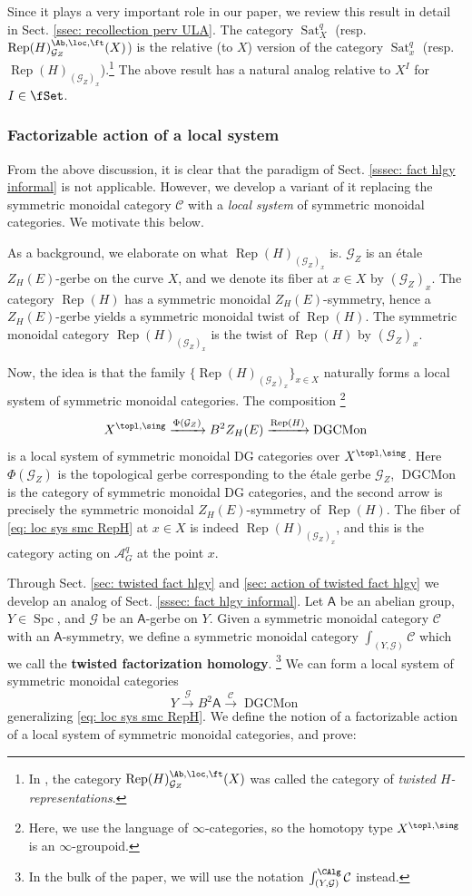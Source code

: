 \documentclass[10pt]{amsart}
\newcommand{\sssec}{\subsubsection}
\theoremstyle{remark}
\newcommand{\on}{\operatorname}
\newcommand{\cA}{\mathcal{A}}
\newcommand{\cC}{\mathcal{C}}
\newcommand{\cG}{\mathcal{G}}
\newcommand{\DGCatSymMon}{\on{DGCMon}}
\newcommand{\Rep}{\on{Rep}}
\newcommand{\Sat}{\on{Sat}}
\newcommand{\Spc}{\on{Spc}}
\newcommand{\sfA}{\mathsf{A}}
\begin{document}
Since it plays a very important role in our paper, we review this result in detail in Sect. \ref{ssec: recollection perv ULA}. The category $\Sat^q_X$ (resp. $\Rep(H)^{\Ab,\loc,\ft}_{\cG_Z}(X)$) is the relative (to $X$) version of the category $\Sat^q_x$ (resp. $\Rep(H)_{(\cG_Z)_x}$).\footnote{In \cite{ZhaoNew}, the category $\Rep(H)^{\Ab,\loc,\ft}_{\cG_Z}(X)$ was called the category of \emph{twisted $H$-representations}.} The above result has a natural analog relative to $X^I$ for $I\in\fSet$.

\sssec{Factorizable action of a local system}
From the above discussion, it is clear that the paradigm of Sect. \ref{sssec: fact hlgy informal} is not applicable. However, we develop a variant of it replacing the symmetric monoidal category $\cC$ with a \emph{local system} of symmetric monoidal categories. We motivate this below.
\medskip

As a background, we elaborate on what $\Rep(H)_{(\cG_Z)_x}$ is. $\cG_Z$ is an \'etale $Z_H(E)$-gerbe on the curve $X$, and we denote its fiber at $x\in X$ by $(\cG_Z)_x$. The category $\Rep(H)$ has a symmetric monoidal $Z_H(E)$-symmetry, hence a $Z_H(E)$-gerbe yields a symmetric monoidal twist of $\Rep(H)$. The symmetric monoidal category $\Rep(H)_{(\cG_Z)_x}$ is the twist of $\Rep(H)$ by $(\cG_Z)_x$. 
\medskip

Now, the idea is that the family $\{\Rep(H)_{(\cG_Z)_x}\}_{x\in X}$ naturally forms a local system of symmetric monoidal categories. The composition \footnote{Here, we use the language of $\infty$-categories, so the homotopy type $X^{\topl,\sing}$ is an $\infty$-groupoid.}
\begin{equation}\label{eq: loc sys smc RepH}
    X^{\topl,\sing}\xrightarrow{\Phi(\cG_Z)}B^2 Z_H(E)\xrightarrow{\Rep(H)}\DGCatSymMon
\end{equation}
is a local system of symmetric monoidal  DG categories over $X^{\topl,\sing}$. Here $\Phi(\cG_Z)$ is the topological gerbe corresponding to the \'etale gerbe $\cG_Z$, $\DGCatSymMon$ is the category of symmetric monoidal DG categories, and the second arrow is precisely the symmetric monoidal $Z_H(E)$-symmetry of $\Rep(H)$. The fiber of \eqref{eq: loc sys smc RepH} at $x\in X$ is indeed $\Rep(H)_{(\cG_Z)_x}$, and this is the category acting on $\cA^q_G$ at the point $x$.\medskip

Through Sect. \ref{sec: twisted fact hlgy} and \ref{sec: action of twisted fact hlgy} we develop an analog of Sect. \ref{sssec: fact hlgy informal}. Let $\sfA$ be an abelian group, $Y\in\Spc$, and $\cG$ be an $\sfA$-gerbe on $Y$. Given a symmetric monoidal category $\cC$ with an $\sfA$-symmetry, we define a symmetric monoidal category $\int_{(Y,\cG)}\cC$ which we call the \textbf{twisted factorization homology}. \footnote{In the bulk of the paper, we will use the notation $\int^{\CAlg}_{(Y,\cG)}\cC$ instead.} 
We can form a local system of symmetric monoidal categories
\begin{equation}\label{eq: loc sys smc C}
    Y\xrightarrow{\cG}B^2\sfA\xrightarrow{\cC}\DGCatSymMon
\end{equation}
generalizing \eqref{eq: loc sys smc RepH}. We define the notion of a factorizable action of a local system of symmetric monoidal categories, and prove:
\end{document}
